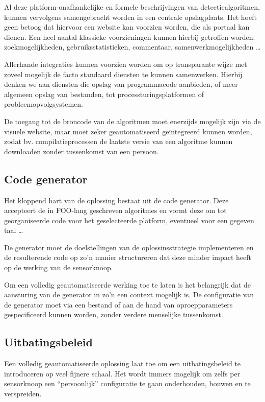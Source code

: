 Al deze platform-onafhankelijke en formele beschrijvingen van
detectiealgoritmen, kunnen vervolgens samengebracht worden in een centrale
opslagplaats. Het hoeft geen betoog dat hiervoor een website kan voorzien
worden, die als portaal kan dienen. Een heel aantal klassieke voorzieningen
kunnen hierbij getroffen worden: zoekmogelijkheden, gebruiksstatistieken,
commentaar, samenwerkmogelijkheden \dots

Allerhande integraties kunnen voorzien worden om op transparante wijze met
zoveel mogelijk de facto standaard diensten te kunnen samenwerken. Hierbij
denken we aan diensten die opslag van programmacode aanbieden, of meer algemeen
opslag van bestanden, tot processturingsplatformen of probleemopvolgsystemen.

De toegang tot de broncode van de algoritmen moet enerzijds mogelijk zijn via
de visuele website, maar moet zeker geautomatiseerd ge\"integreerd kunnen
worden, zodat bv. compilatieprocessen de laatste versie van een algoritme
kunnen downloaden zonder tussenkomst van een persoon.

\subsection{Code generator}
\label{subsection:arch-codegen}

Het kloppend hart van de oplossing bestaat uit de code generator. Deze
accepteert de in FOO-lang geschreven algoritmes en vormt deze om tot
georganiseerde code voor het geselecteerde platform, eventueel voor een gegeven
taal \dots

De generator moet de doelstellingen van de oplossinsstrategie implementeren en
de resulterende code op zo'n manier structureren dat deze minder impact heeft
op de werking van de sensorknoop.

Om een volledig geautomatiseerde werking toe te laten is het belangrijk dat de
aansturing van de generator in zo'n een context mogelijk is. De configuratie
van de generator moet via een bestand of aan de hand van oproepparameters
gespecificeerd kunnen worden, zonder verdere menselijke tussenkomst.

\subsection{Uitbatingsbeleid}
\label{subsection:arch-policy}

Een volledig geautomatiseerde oplossing laat toe om een uitbatingsbeleid te
introduceren op veel fijnere schaal. Het wordt immers mogelijk om zelfs per
sensorknoop een ``persoonlijk'' configuratie te gaan onderhouden, bouwen en te
verspreiden.

